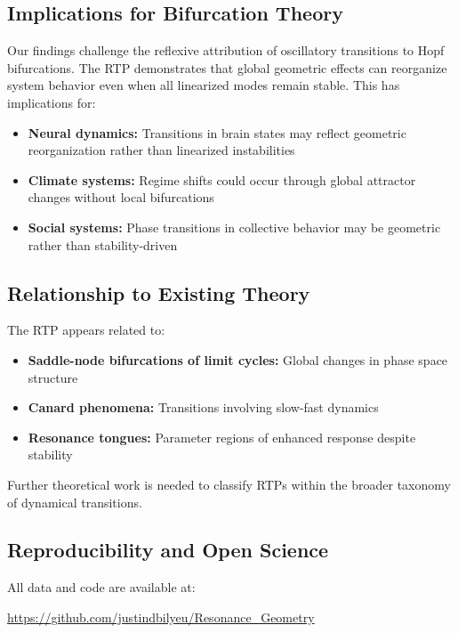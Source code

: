 \documentclass[11pt,twocolumn]{article}
\begin{document}
\subsection{Implications for Bifurcation Theory}

Our findings challenge the reflexive attribution of oscillatory transitions to Hopf bifurcations. The RTP
demonstrates that global geometric effects can reorganize system behavior even when all linearized modes remain
stable. This has implications for:

\begin{itemize}
  \item \textbf{Neural dynamics:} Transitions in brain states may reflect geometric reorganization rather than
        linearized instabilities
  \item \textbf{Climate systems:} Regime shifts could occur through global attractor changes without local
        bifurcations
  \item \textbf{Social systems:} Phase transitions in collective behavior may be geometric rather than
        stability-driven
\end{itemize}

\subsection{Relationship to Existing Theory}

The RTP appears related to:
\begin{itemize}
  \item \textbf{Saddle-node bifurcations of limit cycles:} Global changes in phase space structure
  \item \textbf{Canard phenomena:} Transitions involving slow-fast dynamics
  \item \textbf{Resonance tongues:} Parameter regions of enhanced response despite stability
\end{itemize}

Further theoretical work is needed to classify RTPs within the broader taxonomy of dynamical transitions.

\subsection{Reproducibility and Open Science}

All data and code are available at:
\begin{center}
\url{https://github.com/justindbilyeu/Resonance_Geometry}
\end{center}
\end{document}
